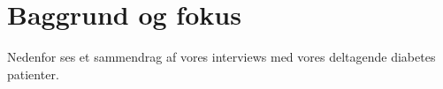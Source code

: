 \section{Baggrund og fokus}
Nedenfor ses et sammendrag af vores interviews med vores deltagende diabetes patienter. 



